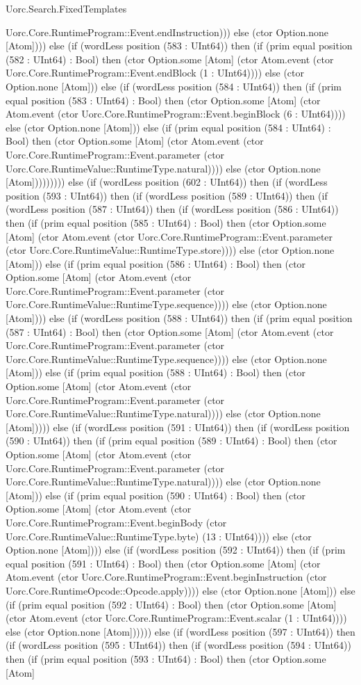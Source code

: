 \begin{lexlean}{Uorc.Search.FixedTemplates}
\begin{semanticmodule}
{Uorc.Core.RuntimeProgram::Event.endInstruction))) else (ctor Option.none [Atom]))) else (if (wordLess position (583 : UInt64)) then (if (prim equal position (582 : UInt64) : Bool) then (ctor Option.some [Atom] (ctor Atom.event (ctor Uorc.Core.RuntimeProgram::Event.endBlock (1 : UInt64)))) else (ctor Option.none [Atom])) else (if (wordLess position (584 : UInt64)) then (if (prim equal position (583 : UInt64) : Bool) then (ctor Option.some [Atom] (ctor Atom.event (ctor Uorc.Core.RuntimeProgram::Event.beginBlock (6 : UInt64)))) else (ctor Option.none [Atom])) else (if (prim equal position (584 : UInt64) : Bool) then (ctor Option.some [Atom] (ctor Atom.event (ctor Uorc.Core.RuntimeProgram::Event.parameter (ctor Uorc.Core.RuntimeValue::RuntimeType.natural)))) else (ctor Option.none [Atom])))))))) else (if (wordLess position (602 : UInt64)) then (if (wordLess position (593 : UInt64)) then (if (wordLess position (589 : UInt64)) then (if (wordLess position (587 : UInt64)) then (if (wordLess position (586 : UInt64)) then (if (prim equal position (585 : UInt64) : Bool) then (ctor Option.some [Atom] (ctor Atom.event (ctor Uorc.Core.RuntimeProgram::Event.parameter (ctor Uorc.Core.RuntimeValue::RuntimeType.store)))) else (ctor Option.none [Atom])) else (if (prim equal position (586 : UInt64) : Bool) then (ctor Option.some [Atom] (ctor Atom.event (ctor Uorc.Core.RuntimeProgram::Event.parameter (ctor Uorc.Core.RuntimeValue::RuntimeType.sequence)))) else (ctor Option.none [Atom]))) else (if (wordLess position (588 : UInt64)) then (if (prim equal position (587 : UInt64) : Bool) then (ctor Option.some [Atom] (ctor Atom.event (ctor Uorc.Core.RuntimeProgram::Event.parameter (ctor Uorc.Core.RuntimeValue::RuntimeType.sequence)))) else (ctor Option.none [Atom])) else (if (prim equal position (588 : UInt64) : Bool) then (ctor Option.some [Atom] (ctor Atom.event (ctor Uorc.Core.RuntimeProgram::Event.parameter (ctor Uorc.Core.RuntimeValue::RuntimeType.natural)))) else (ctor Option.none [Atom])))) else (if (wordLess position (591 : UInt64)) then (if (wordLess position (590 : UInt64)) then (if (prim equal position (589 : UInt64) : Bool) then (ctor Option.some [Atom] (ctor Atom.event (ctor Uorc.Core.RuntimeProgram::Event.parameter (ctor Uorc.Core.RuntimeValue::RuntimeType.natural)))) else (ctor Option.none [Atom])) else (if (prim equal position (590 : UInt64) : Bool) then (ctor Option.some [Atom] (ctor Atom.event (ctor Uorc.Core.RuntimeProgram::Event.beginBody (ctor Uorc.Core.RuntimeValue::RuntimeType.byte) (13 : UInt64)))) else (ctor Option.none [Atom]))) else (if (wordLess position (592 : UInt64)) then (if (prim equal position (591 : UInt64) : Bool) then (ctor Option.some [Atom] (ctor Atom.event (ctor Uorc.Core.RuntimeProgram::Event.beginInstruction (ctor Uorc.Core.RuntimeOpcode::Opcode.apply)))) else (ctor Option.none [Atom])) else (if (prim equal position (592 : UInt64) : Bool) then (ctor Option.some [Atom] (ctor Atom.event (ctor Uorc.Core.RuntimeProgram::Event.scalar (1 : UInt64)))) else (ctor Option.none [Atom]))))) else (if (wordLess position (597 : UInt64)) then (if (wordLess position (595 : UInt64)) then (if (wordLess position (594 : UInt64)) then (if (prim equal position (593 : UInt64) : Bool) then (ctor Option.some [Atom] }
\end{semanticmodule}
\end{lexlean}
